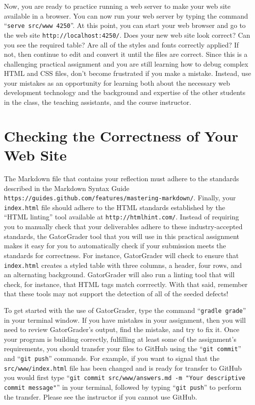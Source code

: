 \documentclass[11pt]{article}
\newcommand{\mainprogram}{\lstinline{index.html}}
\newcommand{\mainprogramsource}{\lstinline{src/www/index.html}}
\newcommand{\gatorgraderstart}{\command{gradle grade}}
\newcommand{\gitcommit}{\command{git commit}}
\newcommand{\gitpush}{\command{git push}}
\newcommand{\gitcommitmainprogram}{\command{git commit src/www/answers.md -m "Your
descriptive commit message"}}
\newcommand{\command}[1]{``\lstinline{#1}''}
\newcommand{\url}[1]{\lstinline{#1}}
\newcommand{\step}[1]{``{#1}''}
\begin{document}
Now, you are ready to practice running a web server to make your web site
available in a browser. You can now run your web server by typing the command
\command{serve src/www 4250}. At this point, you can start your web browser and
go to the web site \url{http://localhost:4250/}. Does your new web site look
correct? Can you see the required table? Are all of the styles and fonts
correctly applied? If not, then continue to edit and convert it until the files
are correct. Since this is a challenging practical assignment and you are still
learning how to debug complex HTML and CSS files, don't become frustrated if you
make a mistake. Instead, use your mistakes as an opportunity for learning both
about the necessary web development technology and the background and expertise
of the other students in the class, the teaching assistants, and the course
instructor.

\section*{Checking the Correctness of Your Web Site}

The Markdown file that contains your reflection must adhere to the standards
described in the Markdown Syntax Guide
\url{https://guides.github.com/features/mastering-markdown/}. Finally, your
\mainprogram{} file should adhere to the HTML standards established by the
\step{HTML linting} tool available at \url{http://htmlhint.com/}. Instead of
requiring you to manually check that your deliverables adhere to these
industry-accepted standards, the GatorGrader tool that you will use in this
practical assignment makes it easy for you to automatically check if your
submission meets the standards for correctness. For instance, GatorGrader will
check to ensure that \mainprogram{} creates a styled table with three columns, a
header, four rows, and an alternating background. GatorGrader will also run a
linting tool that will check, for instance, that HTML tags match corrrectly.
With that said, remember that these tools may not support the detection of all
of the seeded defects!

To get started with the use of GatorGrader, type the command \gatorgraderstart{}
in your terminal window. If you have mistakes in your assignment, then you will
need to review GatorGrader's output, find the mistake, and try to fix it. Once
your program is building correctly, fulfilling at least some of the assignment's
requirements, you should transfer your files to GitHub using the \gitcommit{}
and \gitpush{} commands. For example, if you want to signal that the
\mainprogramsource{} file has been changed and is ready for transfer to GitHub
you would first type \gitcommitmainprogram{} in your terminal, followed by
typing \gitpush{} to perform the transfer. Please see the instructor if you
cannot use GitHub.
\end{document}
